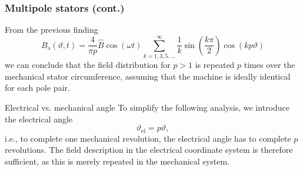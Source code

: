 \begin{frame}
	\frametitle{Multipole stators (cont.)}
        From  the previous finding
        \begin{equation*}
                B_\mathrm{a}(\vartheta, t) = \frac{4}{\pi p} \hat{B} \cos(\omega t)\sum_{k=1,3,5,\ldots}^{\infty}   \frac{1}{k}\sin(\frac{k \pi}{2}) \cos(k p \vartheta)
        \end{equation*}
        we can conclude that the field distribution for $p > 1$ is repeated $p$ times over the mechanical stator circumference, assuming that the  machine is ideally identical for each pole pair. 
        \pause
        \begin{varblock}{Electrical vs. mechanical angle}
            To simplify the following analysis, we introduce the electrical angle 
            \begin{equation}
                \vartheta_\mathrm{el} = p \vartheta,
            \end{equation}
           i.e., to complete one mechanical revolution, the electrical angle has to complete $p$ revolutions. The field description in the electrical coordinate system is therefore sufficient, as this is merely repeated in the mechanical system.
        \end{varblock}
\end{frame}

